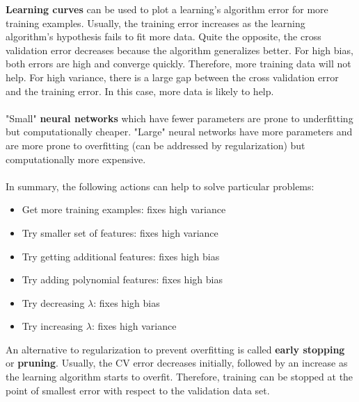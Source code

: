 \documentclass{report}
\begin{document}
{\bf Learning curves} can be used to plot a learning's algorithm error for more training examples. Usually, the training error increases as the learning algorithm's hypothesis fails to fit more data. Quite the opposite, the cross validation error decreases because the algorithm generalizes better. For high bias, both errors are high and converge quickly. Therefore, more training data will not help. For high variance, there is a large gap between the cross validation error and the training error. In this case, more data is likely to help.
\\ \\
"Small" {\bf neural networks} which have fewer parameters are prone to underfitting but computationally cheaper. "Large" neural networks have more parameters and are more prone to overfitting (can be addressed by regularization) but computationally more expensive.
\\ \\
In summary, the following actions can help to solve particular problems:
\begin{itemize}
\item Get more training examples: fixes high variance
\item Try smaller set of features: fixes high variance
\item Try getting additional features: fixes high bias
\item Try adding polynomial features: fixes high bias
\item Try decreasing $\lambda$: fixes high bias
\item Try increasing $\lambda$: fixes high variance
\end{itemize}

An alternative to regularization to prevent overfitting is called {\bf early stopping} or {\bf pruning}.
Usually, the CV error decreases initially, followed by an increase as the learning algorithm starts to overfit.
Therefore, training can be stopped at the point of smallest error with respect to the validation data set.
\end{document}
